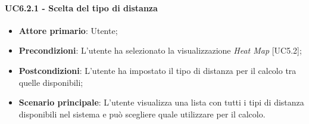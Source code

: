 \paragraph{UC6.2.1 - Scelta del tipo di distanza}
\begin{itemize}
	\item \textbf{Attore primario}: Utente;
	\item \textbf{Precondizioni}: L'utente ha selezionato la visualizzazione \textit{Heat Map} [UC5.2];
	\item \textbf{Postcondizioni}: L'utente ha impostato il tipo di distanza per il calcolo tra quelle disponibili;
	
	\item \textbf{Scenario principale}: L'utente visualizza una lista con tutti i tipi di distanza disponibili nel sistema e può scegliere quale utilizzare per il calcolo.
\end{itemize}